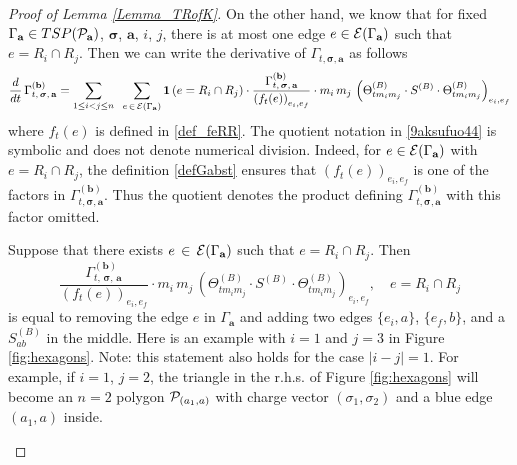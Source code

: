 \documentclass[10pt,reqno]{article}
\theoremstyle{plain} %
\theoremstyle{remark}
\numberwithin{equation}{section}
\begin{document}
\begin{proof}[Proof of Lemma \ref{Lemma_TRofK}]
 On the other hand, we know that for fixed $\Gamma_\textbf{a}\in TSP({\cal P}_\textbf{a})$, $\boldsymbol{\sigma}$, $\textbf{a}$, $i$, $j$, there is at most one edge $e\in {\cal E}(\Gamma_\textbf{a})$ such that $e=R_i \cap R_j$. Then we can write the derivative of $\Gamma_{t, \boldsymbol{\sigma}, \textbf{a}}$  as follows
\begin{equation}\label{9aksufuo44}
  \frac{d}{dt} \, \Gamma^{(\textbf{b})}_{t, \,\boldsymbol{\sigma}
       ,\, \textbf{a}} = \sum_{1\le i < j\le n }\; \; \sum_{e\,\in \,{\cal E}(\Gamma_\textbf{a})} \textbf{1} \left(e=R_i\cap R_j\right) 
       \cdot \frac{\Gamma^{(\textbf{b})}_{t, \,\boldsymbol{\sigma}
       ,\, \textbf{a}}}{\left(f_t(e)\right)_{e_i,e_f}} 
       \cdot m_i \,m_j \,\left(\Theta^{(B)}_{t m_i m_j} \cdot S^{(B)} \cdot \Theta^{(B)}_{t m_i m_j}\right)_{e_i,e_f} 
\end{equation}
where $f_t(e)$ is defined in \eqref{def_feRR}. 
The quotient notation in \eqref{9aksufuo44} is symbolic and does not denote numerical division. Indeed, for \(e\in {\cal E}(\Gamma_\textbf{a})\) with \(e=R_i\cap R_j\), the definition
\eqref{defGabst} ensures that \((f_t(e))_{e_i,e_f}\) is one of the factors in
\(\Gamma^{(\textbf{b})}_{t,\boldsymbol{\sigma},\textbf{a}}\). Thus the quotient denotes the product defining \(\Gamma^{(\textbf{b})}_{t,\boldsymbol{\sigma},\textbf{a}}\) with this factor omitted.
 
Suppose  that there  exists $e\,\in \,{\cal E}(\Gamma_\textbf{a})$ such that  $e=R_i\cap R_j$.  Then 
$$
\frac{\Gamma^{(\textbf{b})}_{t, \,\boldsymbol{\sigma}
       ,\, \textbf{a}}}{\left(f_t(e)\right)_{e_i,e_f}} 
       \cdot m_i \,m_j \,\left(\Theta^{(B)}_{t m_i m_j} \cdot S^{(B)} \cdot \Theta^{(B)}_{t m_i m_j}\right)_{e_i,e_f}  ,\quad e=R_i\cap R_j 
       $$
    is equal to removing the edge $e$ in $\Gamma_\textbf{a}$ and adding two edges $\{e_i, a\}$, $\{e_f, b\}$, and a $S^{(B)}_{ab}$ in the middle. Here is an example with $i=1$ and $j=3$ in Figure \ref{fig:hexagons}. Note: this statement also holds for the case $|i-j|=1$. For example, if $i=1$, $j=2$, the triangle in the r.h.s. of Figure \ref{fig:hexagons} will become an $n=2$ polygon ${\cal P}_{(a_1,a)}$ with charge vector $(\sigma_1,\sigma_2)$ and a blue edge $(a_1,a)$ inside. 
   \begin{figure}[h!]
   \hspace{0.5in}
\end{figure}
\end{proof}
\end{document}
